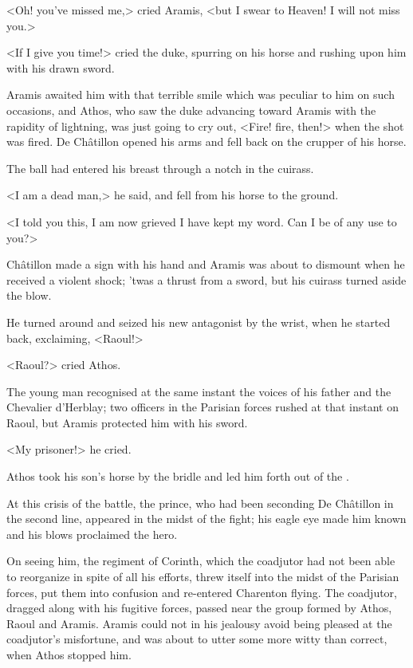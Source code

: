 <Oh! you've missed me,> cried Aramis, <but I swear to Heaven! I will not miss you.>

<If I give you time!> cried the duke, spurring on his horse and rushing upon him with his drawn sword.

Aramis awaited him with that terrible smile which was peculiar to him on such occasions, and Athos, who saw the duke advancing toward Aramis with the rapidity of lightning, was just going to cry out, <Fire! fire, then!> when the shot was fired. De Châtillon opened his arms and fell back on the crupper of his horse.

The ball had entered his breast through a notch in the cuirass.

<I am a dead man,> he said, and fell from his horse to the ground.

<I told you this, I am now grieved I have kept my word. Can I be of any use to you?>

Châtillon made a sign with his hand and Aramis was about to dismount when he received a violent shock; 'twas a thrust from a sword, but his cuirass turned aside the blow.

He turned around and seized his new antagonist by the wrist, when he started back, exclaiming, <Raoul!>

<Raoul?> cried Athos.

The young man recognised at the same instant the voices of his father and the Chevalier d'Herblay; two officers in the Parisian forces rushed at that instant on Raoul, but Aramis protected him with his sword.

<My prisoner!> he cried.

Athos took his son's horse by the bridle and led him forth out of the .

At this crisis of the battle, the prince, who had been seconding De Châtillon in the second line, appeared in the midst of the fight; his eagle eye made him known and his blows proclaimed the hero.

On seeing him, the regiment of Corinth, which the coadjutor had not been able to reorganize in spite of all his efforts, threw itself into the midst of the Parisian forces, put them into confusion and re-entered Charenton flying. The coadjutor, dragged along with his fugitive forces, passed near the group formed by Athos, Raoul and Aramis. Aramis could not in his jealousy avoid being pleased at the coadjutor's misfortune, and was about to utter some  more witty than correct, when Athos stopped him.

